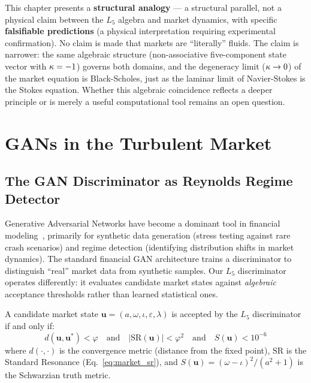 \begin{remark}
This chapter presents a \textbf{structural analogy} --- a structural parallel, not a physical claim between the $L_5$ algebra and market dynamics, with specific \textbf{falsifiable predictions} (a physical interpretation requiring experimental confirmation). No claim is made that markets are ``literally'' fluids. The claim is narrower: the same algebraic structure (non-associative five-component state vector with $\kappa = -1$) governs both domains, and the degeneracy limit ($\kappa \to 0$) of the market equation is Black-Scholes, just as the laminar limit of Navier-Stokes is the Stokes equation. Whether this algebraic coincidence reflects a deeper principle or is merely a useful computational tool remains an open question.
\end{remark}

\section{GANs in the Turbulent Market}

\subsection{The GAN Discriminator as Reynolds Regime Detector}

Generative Adversarial Networks have become a dominant tool in financial modeling~\cite{takahashi2019,eckerli2021}, primarily for synthetic data generation (stress testing against rare crash scenarios) and regime detection (identifying distribution shifts in market dynamics). The standard financial GAN architecture trains a discriminator to distinguish ``real'' market data from synthetic samples. Our $L_5$ discriminator operates differently: it evaluates candidate market states against \emph{algebraic} acceptance thresholds rather than learned statistical ones.

\begin{definition}
A candidate market state $\mathbf{u} = (a, \omega, \iota, \varepsilon, \lambda)$ is accepted by the $L_5$ discriminator if and only if:
\begin{equation}
    d(\mathbf{u}, \mathbf{u}^*) < \varphi \quad\text{and}\quad |\mathrm{SR}(\mathbf{u})| < \varphi^2 \quad\text{and}\quad S(\mathbf{u}) < 10^{-6}
\end{equation}
where $d(\cdot, \cdot)$ is the convergence metric (distance from the fixed point), $\mathrm{SR}$ is the Standard Resonance (Eq.~\ref{eq:market_sr}), and $S(\mathbf{u}) = (\omega - \iota)^2 / (a^2 + 1)$ is the Schwarzian truth metric.
\end{definition}

